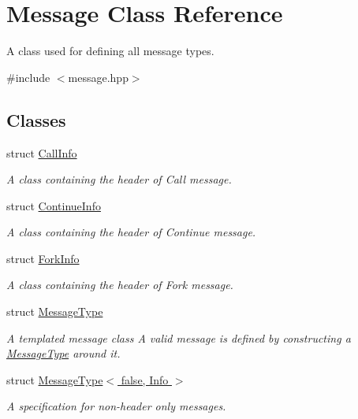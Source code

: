 \hypertarget{class_message}{}\section{Message Class Reference}
\label{class_message}


A class used for defining all message types.  




{\ttfamily \#include $<$message.\+hpp$>$}

\subsection*{Classes}
\begin{DoxyCompactItemize}
\item 
struct \hyperlink{struct_message_1_1_call_info}{Call\+Info}
\begin{DoxyCompactList}\small\item\em A class containing the header of Call message. \end{DoxyCompactList}\item 
struct \hyperlink{struct_message_1_1_continue_info}{Continue\+Info}
\begin{DoxyCompactList}\small\item\em A class containing the header of Continue message. \end{DoxyCompactList}\item 
struct \hyperlink{struct_message_1_1_fork_info}{Fork\+Info}
\begin{DoxyCompactList}\small\item\em A class containing the header of Fork message. \end{DoxyCompactList}\item 
struct \hyperlink{struct_message_1_1_message_type}{Message\+Type}
\begin{DoxyCompactList}\small\item\em A templated message class A valid message is defined by constructing a \hyperlink{struct_message_1_1_message_type}{Message\+Type} around it. \end{DoxyCompactList}\item 
struct \hyperlink{struct_message_1_1_message_type_3_01false_00_01_info_01_4}{Message\+Type$<$ false, Info $>$}
\begin{DoxyCompactList}\small\item\em A specification for non-\/header only messages. \end{DoxyCompactList}\item 

\end{DoxyCompactItemize}
